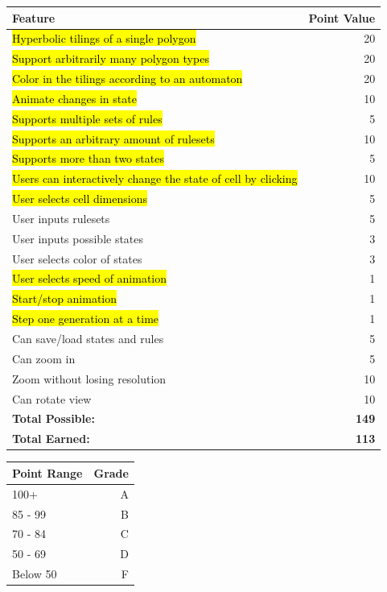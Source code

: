 \documentclass[letterpaper,12pt]{article}
\begin{document}
\footnotesize
	\hspace{-5em}
	\begin{tabular}{ | l | r | }
	    \hline
	    \textbf{Feature} & \textbf{Point Value} \\ \hline
	    \hl{Hyperbolic tilings of a single polygon} & 20 \\ \hline
	    \hl{Support arbitrarily many polygon types} & 20 \\ \hline
	    \hl{Color in the tilings according to an automaton} & 20 \\ \hline
	    \hl{Animate changes in state} & 10 \\ \hline
	    \hl{Supports multiple sets of rules} & 5 \\ \hline
		\hl{Supports an arbitrary amount of rulesets} & 10 \\ \hline
		\hl{Supports more than two states} & 5 \\ \hline
		\hl{Users can interactively change the state of cell by clicking} & 10 \\ \hline
		\hl{User selects cell dimensions} & 5 \\ \hline
		User inputs rulesets & 5 \\ \hline
		User inputs possible states & 3 \\ \hline
		User selects color of states & 3 \\ \hline
		\hl{User selects speed of animation} & 1 \\ \hline
		\hl{Start/stop animation} & 1 \\ \hline
		\hl{Step one generation at a time} & 1 \\ \hline
		Can save/load states and rules & 5 \\ \hline
		Can zoom in & 5 \\ \hline
		Zoom without losing resolution & 10 \\ \hline
		Can rotate view & 10 \\ \hline
		\textbf{Total Possible:} & \textbf{149} \\ \hline
		\textbf{Total Earned:} & \textbf{113} \\ \hline
	\end{tabular}
\quad
\footnotesize
\begin{tabular}{ | l | r | }
    \hline
    \textbf{Point Range} & \textbf{Grade} \\ \hline
    100+ & A \\ \hline
    85 - 99 & B \\ \hline
    70 - 84 & C \\ \hline
    50 - 69 & D \\ \hline
    Below 50 & F \\ \hline

 \end{tabular}


\end{document}
